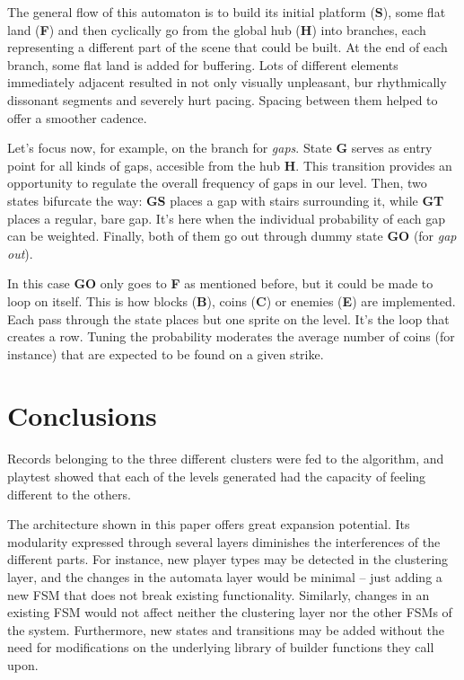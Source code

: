\documentclass[conference]{IEEEtran}
\begin{document}
The general flow of this automaton is to build its initial platform ({\bf S}), some flat land ({\bf F}) and then cyclically go from the global hub ({\bf H}) into branches, each representing a different part of the scene that could be built. At the end of each branch, some flat land is added for buffering. Lots of different elements immediately adjacent resulted in not only visually unpleasant, bur rhythmically dissonant segments and severely hurt pacing. Spacing between them helped to offer a smoother cadence.

Let's focus now, for example, on the branch for \textit{gaps}. State {\bf G} serves as entry point for all kinds of gaps, accesible from the hub {\bf H}. This transition provides an opportunity to regulate the overall frequency of gaps in our level. Then, two states bifurcate the way: {\bf GS} places a gap with stairs surrounding it, while {\bf GT} places a regular, bare gap. It's here when the individual probability of each gap can be weighted. Finally, both of them go out through dummy state {\bf GO} (for {\it gap out}).

In this case {\bf GO} only goes to {\bf F} as mentioned before, but it could be made to loop on itself. This is how blocks ({\bf B}), coins ({\bf C}) or enemies ({\bf E}) are implemented. Each pass through the state places but one sprite on the level. It's the loop that creates a row. Tuning the probability moderates the average number of coins (for instance) that are expected to be found on a given strike.

\section{Conclusions}

Records belonging to the three different clusters were fed to the algorithm, and playtest showed that each of the levels generated had the capacity of feeling different to the others.

The architecture shown in this paper offers great expansion potential. Its modularity expressed through several layers diminishes the interferences of the different parts. For instance, new player types may be detected in the clustering layer, and the changes in the automata layer would be minimal -- just adding a new FSM that does not break existing functionality. Similarly, changes in an existing FSM would not affect neither the clustering layer nor the other FSMs of the system. Furthermore, new states and transitions may be added without the need for modifications on the underlying library of builder functions they call upon.
\end{document}
